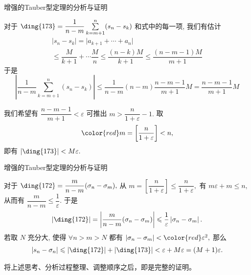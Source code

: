 
\begin{frame}{增强的Tauber型定理的分析与证明}

对于 $\text{\ding{173}} = \dfrac{1}{n-m} \sum\limits_{k=m+1}^{n} (s_n - s_k)$ 和式中的每一项, 我们有估计
{\smaller
\begin{multline*}
  \lvert s_n - s_k \rvert = \lvert a_{k+1} + \cdots + a_n \rvert \\
  \leqslant \dfrac{M}{k+1} + \cdots \dfrac{M}{n} \leqslant \dfrac{(n-k)M}{k+1} \leqslant \dfrac{(n-m-1)M}{m+1}
\end{multline*}
}
于是
{\smaller
$$
\left\lvert \dfrac{1}{n-m} \sum\limits_{k=m+1}^{n} (s_n - s_k) \right\rvert \leqslant \dfrac{1}{n-m} (n-m) \dfrac{n-m-1}{m+1} M = \dfrac{n-m-1}{m+1} M
$$
}

\pause

我们希望有 $\dfrac{n-m-1}{m+1} < \varepsilon$ 可推出 $m > \dfrac{n}{1 + \varepsilon} - 1.$ 取
$$\color{red} m = \left[ \dfrac{n}{1 + \varepsilon} \right] < n,$$
即有 $\lvert \text{\ding{173}} \rvert < M \varepsilon.$

\end{frame}


\begin{frame}{增强的Tauber型定理的分析与证明}

对于 $\text{\ding{172}} = \dfrac{m}{n - m}(\sigma_n - \sigma_m),$ 从 $m = \left[ \dfrac{n}{1 + \varepsilon} \right] \leqslant \dfrac{n}{1 + \varepsilon},$ 有 $m \varepsilon + m \leqslant n,$ 从而有 $\dfrac{m}{n - m} \leqslant \dfrac{1}{\varepsilon}.$ 于是
$$\lvert \text{\ding{172}} \rvert = \left\lvert \dfrac{m}{n - m}(\sigma_n - \sigma_m) \right\rvert \leqslant \dfrac{1}{\varepsilon} \left\lvert \sigma_n - \sigma_m \right\rvert.$$
若取 $N$ 充分大, 使得 $\forall n > m > N$ 都有 $\left\lvert \sigma_n - \sigma_m \right\rvert < {\color{red} \varepsilon^2},$ 那么
$$\left\lvert s_n - \sigma_n \right\rvert \leqslant \lvert \text{\ding{172}} \rvert + \lvert \text{\ding{173}} \rvert < \varepsilon + M \varepsilon = (M+1)\varepsilon.$$

\pause
\vspace{1em}

将上述思考、分析过程整理、调整顺序之后，即是完整的证明。

\end{frame}


